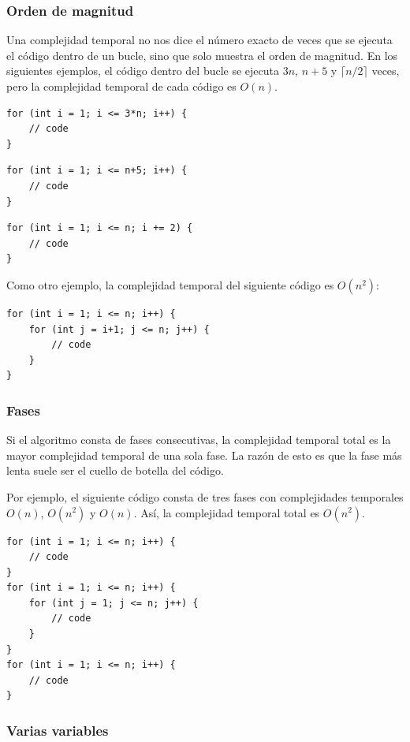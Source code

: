 \subsubsection*{Orden de magnitud}

Una complejidad temporal no nos dice el número exacto
de veces que se ejecuta el código dentro de un bucle,
sino que solo muestra el orden de magnitud.
En los siguientes ejemplos, el código dentro del bucle
se ejecuta $3n$, $n+5$ y $\lceil n/2 \rceil$ veces,
pero la complejidad temporal de cada código es $O(n)$.

\begin{lstlisting}
for (int i = 1; i <= 3*n; i++) {
    // code
}
\end{lstlisting}

\begin{lstlisting}
for (int i = 1; i <= n+5; i++) {
    // code
}
\end{lstlisting}

\begin{lstlisting}
for (int i = 1; i <= n; i += 2) {
    // code
}
\end{lstlisting}

Como otro ejemplo,
la complejidad temporal del siguiente código es $O(n^2)$:

\begin{lstlisting}
for (int i = 1; i <= n; i++) {
    for (int j = i+1; j <= n; j++) {
        // code
    }
}
\end{lstlisting}

\subsubsection*{Fases}

Si el algoritmo consta de fases consecutivas,
la complejidad temporal total es la mayor
complejidad temporal de una sola fase.
La razón de esto es que la fase más lenta
suele ser el cuello de botella del código.

Por ejemplo, el siguiente código consta
de tres fases con complejidades temporales
$O(n)$, $O(n^2)$ y $O(n)$.
Así, la complejidad temporal total es $O(n^2)$.

\begin{lstlisting}
for (int i = 1; i <= n; i++) {
    // code
}
for (int i = 1; i <= n; i++) {
    for (int j = 1; j <= n; j++) {
        // code
    }
}
for (int i = 1; i <= n; i++) {
    // code
}
\end{lstlisting}

\subsubsection*{Varias variables}

